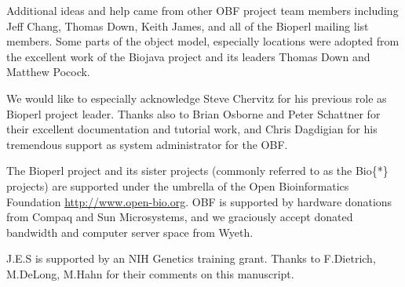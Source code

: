 \documentclass[12pt]{article}
\begin{document}
Additional ideas and help came from other OBF project team members
including Jeff Chang, Thomas Down, Keith James, and all of the Bioperl
mailing list members.  Some parts of the object model, especially
locations were adopted from the excellent work of the Biojava project
and its leaders Thomas Down and Matthew Pocock.

We would like to especially acknowledge Steve Chervitz for his
previous role as Bioperl project leader.  Thanks also to Brian Osborne
and Peter Schattner for their excellent documentation and tutorial
work, and Chris Dagdigian for his tremendous support as system
administrator for the OBF.

The Bioperl project and its sister projects (commonly referred to as
the Bio\{*\} projects) are supported under the umbrella of the Open
Bioinformatics Foundation \url{http://www.open-bio.org}.
OBF is supported by hardware donations from Compaq and Sun
Microsystems, and we graciously accept donated bandwidth and computer
server space from Wyeth.

J.E.S is supported by an NIH Genetics training grant.  Thanks to
F.Dietrich, M.DeLong, M.Hahn for their comments on this manuscript.


 

\newpage
\end{document}
